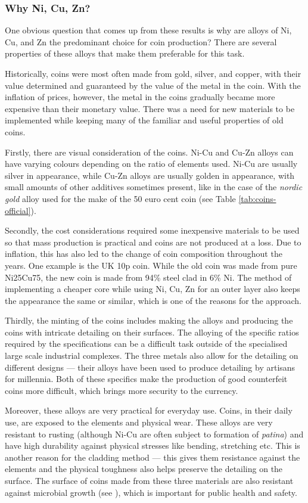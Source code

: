 \documentclass[11pt,a4paper,twoside,onecolumn]{article}
\begin{document}
\subsubsection{Why Ni, Cu, Zn?}
One obvious question that comes up from these results is why are alloys of Ni, Cu, and Zn the predominant choice for coin production? There are several properties of these alloys that make them preferable for this task.

Historically, coins were most often made from gold, silver, and copper, with their value determined and guaranteed by the value of the metal in the coin. With the inflation of prices, however, the metal in the coins gradually became more expensive than their monetary value. There was a need for new materials to be implemented while keeping many of the familiar and useful properties of old coins.

Firstly, there are visual consideration of the coins. Ni-Cu and Cu-Zn alloys can have varying colours depending on the ratio of elements used. Ni-Cu are usually silver in appearance, while Cu-Zn alloys are usually golden in appearance, with small amounts of other additives sometimes present, like in the case of the \emph{nordic gold} alloy used for the make of the 50 euro cent coin (see Table \ref{tab:coins-official}).

Secondly, the cost considerations required some inexpensive materials to be used so that mass production is practical and coins are not produced at a loss. Due to inflation, this has also led to the change of coin composition throughout the years. One example is the UK 10p coin. While the old coin was made from pure Ni25Cu75, the new coin is made from 94\% steel clad in 6\% Ni. The method of implementing a cheaper core while using Ni, Cu, Zn for an outer layer also keeps the appearance the same or similar, which is one of the reasons for the approach.

Thirdly, the minting of the coins includes making the alloys and producing the coins with intricate detailing on their surfaces. The alloying of the specific ratios required by the specifications can be a difficult task outside of the specialised large scale industrial complexes. The three metals also allow for the detailing on different designs --- their alloys have been used to produce detailing by artisans for millennia. Both of these specifics make the production of good counterfeit coins more difficult, which brings more security to the currency.

Moreover, these alloys are very practical for everyday use. Coins, in their daily use, are exposed to the elements and physical wear. These alloys are very resistant to rusting (although Ni-Cu are often subject to formation of \emph{patina}) and have high durability against physical stresses like bending, stretching etc. This is another reason for the cladding method --- this gives them resistance against the elements and the physical toughness also helps preserve the detailing on the surface. The surface of coins made from these three materials are also resistant against microbial growth (see \cite{Vriesekoop2016}), which is important for public health and safety.
\end{document}
